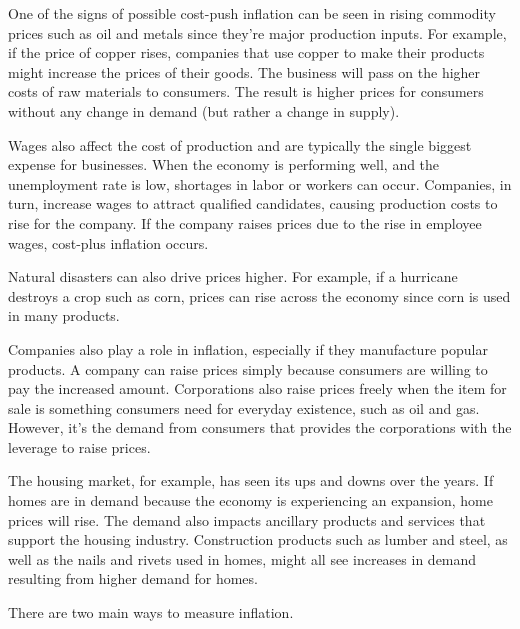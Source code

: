 \documentclass{article}
\begin{document}
    \begin{example}
      One of the signs of possible cost-push inflation can be seen in rising commodity prices such as oil and metals since they're major production inputs. For example, if the price of copper rises, companies that use copper to make their products might increase the prices of their goods. The business will pass on the higher costs of raw materials to consumers. The result is higher prices for consumers without any change in demand (but rather a change in supply). 

      Wages also affect the cost of production and are typically the single biggest expense for businesses. When the economy is performing well, and the unemployment rate is low, shortages in labor or workers can occur. Companies, in turn, increase wages to attract qualified candidates, causing production costs to rise for the company. If the company raises prices due to the rise in employee wages, cost-plus inflation occurs. 

      Natural disasters can also drive prices higher. For example, if a hurricane destroys a crop such as corn, prices can rise across the economy since corn is used in many products.
    \end{example}

    \begin{example}
      Companies also play a role in inflation, especially if they manufacture popular products. A company can raise prices simply because consumers are willing to pay the increased amount. Corporations also raise prices freely when the item for sale is something consumers need for everyday existence, such as oil and gas. However, it's the demand from consumers that provides the corporations with the leverage to raise prices.
    \end{example}

    \begin{example}
      The housing market, for example, has seen its ups and downs over the years. If homes are in demand because the economy is experiencing an expansion, home prices will rise. The demand also impacts ancillary products and services that support the housing industry. Construction products such as lumber and steel, as well as the nails and rivets used in homes, might all see increases in demand resulting from higher demand for homes.
    \end{example}

    There are two main ways to measure inflation. 
\end{document}
